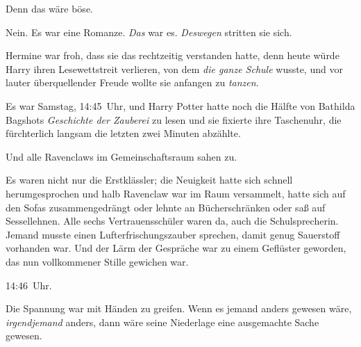 Denn das wäre böse.

Nein. Es war eine Romanze. \emph{Das} war es. \emph{Deswegen} stritten sie sich.

Hermine war froh, dass sie das rechtzeitig verstanden hatte, denn heute würde Harry ihren Lesewettstreit verlieren, von dem \emph{die ganze Schule} wusste, und vor lauter überquellender Freude wollte sie anfangen zu \emph{tanzen}.

Es war Samstag, 14:45~Uhr, und Harry Potter hatte noch die Hälfte von Bathilda Bagshots \emph{Geschichte der Zauberei} zu lesen und sie fixierte ihre Taschenuhr, die fürchterlich langsam die letzten zwei Minuten abzählte.

Und alle Ravenclaws im Gemeinschaftsraum sahen zu.

Es waren nicht nur die Erstklässler; die Neuigkeit hatte sich schnell herumgesprochen und halb Ravenclaw war im Raum versammelt, hatte sich auf den Sofas zusammengedrängt oder lehnte an Bücherschränken oder saß auf Sessellehnen. Alle sechs Vertrauensschüler waren da, auch die Schulsprecherin. Jemand musste einen Lufterfrischungszauber sprechen, damit genug Sauerstoff vorhanden war. Und der Lärm der Gespräche war zu einem Geflüster geworden, das nun vollkommener Stille gewichen war.

14:46~Uhr.

Die Spannung war mit Händen zu greifen. Wenn es jemand anders gewesen wäre, \emph{irgendjemand} anders, dann wäre seine Niederlage eine ausgemachte Sache gewesen.

